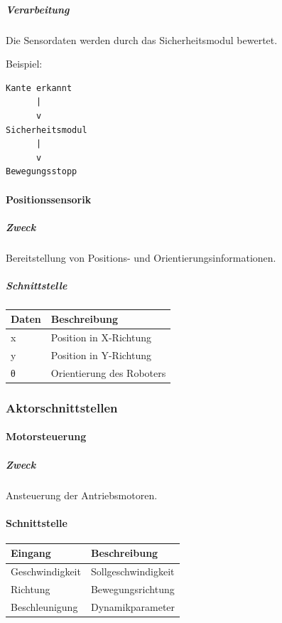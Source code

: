 \subparagraph{Verarbeitung}\label{verarbeitung}

Die Sensordaten werden durch das Sicherheitsmodul bewertet.

Beispiel:

\begin{verbatim}
Kante erkannt
      |
      v
Sicherheitsmodul
      |
      v
Bewegungsstopp
\end{verbatim}

\paragraph{Positionssensorik}\label{positionssensorik-2}

\subparagraph{Zweck}\label{zweck-2}

Bereitstellung von Positions- und Orientierungsinformationen.

\subparagraph{Schnittstelle}\label{schnittstelle-2}

\begin{longtable}[]{@{}ll@{}}
\toprule\noalign{}
Daten & Beschreibung \\
\midrule\noalign{}
\endhead
\bottomrule\noalign{}
\endlastfoot
x & Position in X-Richtung \\
y & Position in Y-Richtung \\
θ & Orientierung des Roboters \\
\end{longtable}

\subsubsection{Aktorschnittstellen}\label{aktorschnittstellen}

\paragraph{Motorsteuerung}\label{motorsteuerung}

\subparagraph{Zweck}\label{zweck-3}

Ansteuerung der Antriebsmotoren.

\paragraph{Schnittstelle}\label{schnittstelle-3}

\begin{longtable}[]{@{}ll@{}}
\toprule\noalign{}
Eingang & Beschreibung \\
\midrule\noalign{}
\endhead
\bottomrule\noalign{}
\endlastfoot
Geschwindigkeit & Sollgeschwindigkeit \\
Richtung & Bewegungsrichtung \\
Beschleunigung & Dynamikparameter \\
\end{longtable}

